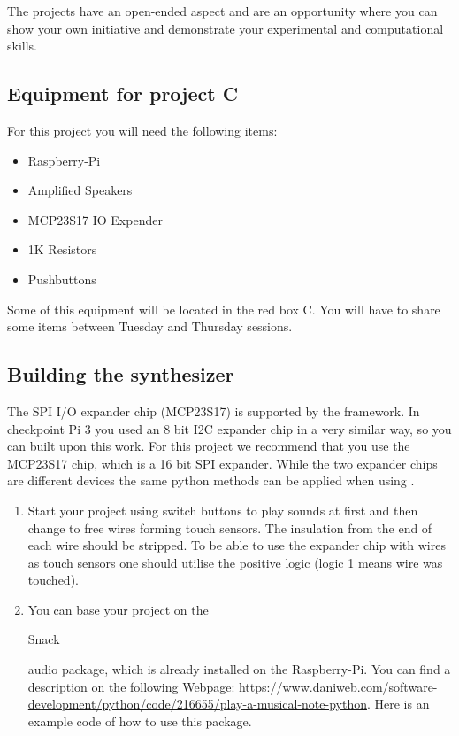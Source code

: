 The projects have an open-ended aspect and are an opportunity where you can show your own initiative and demonstrate your experimental and computational skills. 


\subsection{Equipment for project C}

For this project you will need the following items:
\begin{itemize}
\item Raspberry-Pi
\item  Amplified Speakers
\item MCP23S17 IO Expender
\item 1K Resistors
\item Pushbuttons
\end{itemize}
Some of this equipment will be located in the red box C. You will have to share some items between Tuesday and Thursday sessions. 


\subsection{Building the synthesizer}

The SPI I/O expander chip (MCP23S17) is supported by the \webiopi framework. In checkpoint Pi 3 you used an 8 bit I2C expander chip in a very similar way, so you can built upon this work. For this project we recommend that you use the MCP23S17 chip, which is a 16 bit SPI expander. While the
two expander chips are different devices the same python methods can be applied when using \webiopi.
 
\begin{enumerate}
\item Start your project using switch buttons to play sounds at first and then change to free wires forming touch sensors. The insulation from the end of each wire should be stripped. To be able to use the expander chip with wires as touch sensors one should utilise the positive logic (logic 1 means wire was touched).

\item You can base your project on the \begin{tt}Snack\end{tt}  audio package, which is already installed on the Raspberry-Pi. You can find a description on the following Webpage: \url{https://www.daniweb.com/software-development/python/code/216655/play-a-musical-note-python}.
%
Here is an example code of how to use this package.\\


\vspace*{-0.5cm}
\end{enumerate}


